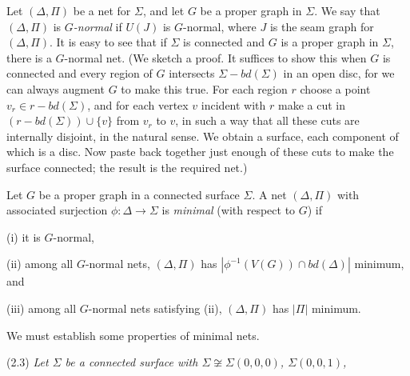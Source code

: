 Let $(\Delta, \Pi)$ be a net for $\Sigma$, and let $G$ be a proper graph in $\Sigma$. We say that $(\Delta, \Pi)$ is \textit{$G$-normal} if $U(J)$ is $G$-normal, where $J$ is the seam graph for $(\Delta, \Pi)$. It is easy to see that if $\Sigma$ is connected and $G$ is a proper graph in $\Sigma$, there is a $G$-normal net. (We sketch a proof. It suffices to show this when $G$ is connected and every region of $G$ intersects $\Sigma - bd(\Sigma)$ in an open disc, for we can always augment $G$ to make this true. For each region $r$ choose a point $v_r \in r - bd(\Sigma)$, and for each vertex $v$ incident with $r$ make a cut in $(r - bd(\Sigma)) \cup \{v\}$ from $v_r$ to $v$, in such a way that all these cuts are internally disjoint, in the natural sense. We obtain a surface, each component of which is a disc. Now paste back together just enough of these cuts to make the surface connected; the result is the required net.)

Let $G$ be a proper graph in a connected surface $\Sigma$. A net $(\Delta, \Pi)$ with associated surjection $\phi \colon \Delta \to \Sigma$ is \textit{minimal} (with respect to $G$) if

\hspace*{12pt}(i) it is $G$-normal,

\hspace*{12pt}(ii) among all $G$-normal nets, $(\Delta, \Pi)$ has $|\phi^{-1}(V(G)) \cap bd(\Delta)|$ minimum, and

\hspace*{12pt}(iii) among all $G$-normal nets satisfying (ii), $(\Delta, \Pi)$ has $|\Pi|$ minimum.

We must establish some properties of minimal nets.

\stmt
(2.3) \textit{Let $\Sigma$ be a connected surface with $\Sigma \not\cong \Sigma(0, 0, 0)$, $\Sigma(0, 0, 1)$,}
